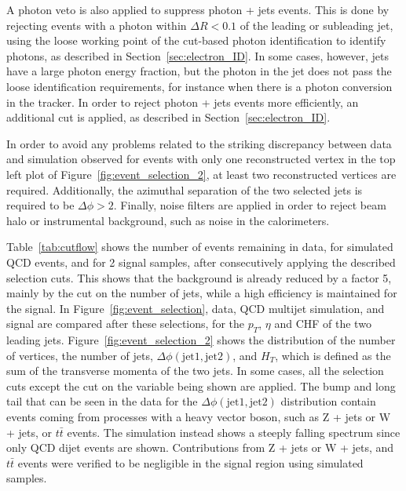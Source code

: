 A photon veto is also applied to suppress photon + jets events. This is done by rejecting events with a photon within $\Delta R < 0.1$ of the leading or subleading jet, using the loose working point of the cut-based photon identification to identify photons, as described in Section~\ref{sec:electron_ID}. In some cases, however, jets have a large photon energy fraction, but the photon in the jet does not pass the loose identification requirements, for instance when there is a photon conversion in the tracker. In order to reject photon + jets events more efficiently, an additional cut is applied, as described in Section~\ref{sec:electron_ID}.

In order to avoid any problems related to the striking discrepancy between data and simulation observed for events with only one reconstructed vertex in the top left plot of Figure~\ref{fig:event_selection_2}, at least two reconstructed vertices are required. Additionally, the azimuthal separation of the two selected jets is required to be $\Delta\phi > 2$. Finally, noise filters are applied in order to reject beam halo or instrumental background, such as noise in the calorimeters.

Table~\ref{tab:cutflow} shows the number of events remaining in data, for simulated QCD events, and for 2 signal samples, after consecutively applying the described selection cuts. This shows that the background is already reduced by a factor 5, mainly by the cut on the number of jets, while a high efficiency is maintained for the signal. In Figure~\ref{fig:event_selection}, data, \acs{QCD} multijet simulation, and signal are compared after these selections, for the $p_T$, $\eta$ and CHF of the two leading jets. Figure~\ref{fig:event_selection_2} shows the distribution of the number of vertices, the number of jets, $\Delta\phi(\mathrm{jet}1, \mathrm{jet}2)$, and $H_{T}$, which is defined as the sum of the transverse momenta of the two jets. In some cases, all the selection cuts except the cut on the variable being shown are applied. The bump and long tail that can be seen in the data for the $\Delta\phi(\mathrm{jet}1, \mathrm{jet}2)$ distribution contain events coming from processes with a heavy vector boson, such as Z + jets or W + jets, or $t\bar{t}$ events. The simulation instead shows a steeply falling spectrum since only \acs{QCD} dijet events are shown. Contributions from Z + jets or W + jets, and $t\bar{t}$ events were verified to be negligible in the signal region using simulated samples.

